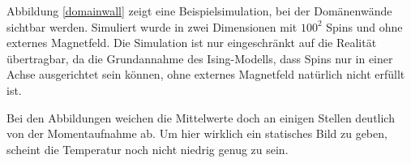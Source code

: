 Abbildung \ref{domainwall} zeigt eine Beispielsimulation, bei der Domänenwände sichtbar werden.
Simuliert wurde in zwei Dimensionen mit $100^2$ Spins und ohne externes Magnetfeld.
Die Simulation ist nur eingeschränkt auf die Realität übertragbar, da die Grundannahme des Ising-Modells, dass Spins nur in einer Achse ausgerichtet sein können, ohne externes Magnetfeld natürlich nicht erfüllt ist.

Bei den Abbildungen weichen die Mittelwerte doch an einigen Stellen deutlich von der Momentaufnahme ab.
Um hier wirklich ein statisches Bild zu geben, scheint die Temperatur noch nicht niedrig genug zu sein.
